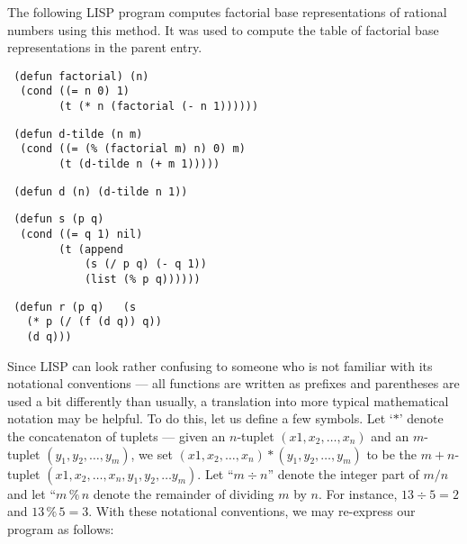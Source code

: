 \documentclass[12pt]{article}
\begin{document}
The following LISP program computes factorial base
representations of rational numbers using this method.
It was used to compute the table of factorial base
representations in the parent entry.

\begin{flushleft}
\texttt{
(defun factorial) (n) \\
\ \ (cond ((= n 0) 1) \\
\ \ \ \ \ \ \ \ (t (* n (factorial (- n 1))))))}
\end{flushleft}

\begin{flushleft}
\texttt{
(defun d-tilde (n m) \\
\ \ (cond ((= (\% (factorial m) n) 0) m) \\
\ \ \ \ \ \ \ \ (t (d-tilde n (+ m 1))))) }
\end{flushleft}

\begin{flushleft}
\texttt{
(defun d (n) (d-tilde n 1))}
\end{flushleft}

\begin{flushleft}
\texttt{
(defun s (p q) \\
\ \ (cond ((= q 1) nil) \\
\ \ \ \ \ \ \ \ (t (append \\
\ \ \ \ \ \ \ \ \ \ \ \ (s (/ p q) (- q 1)) \\
\ \ \ \ \ \ \ \ \ \ \ \ (list (\% p q)))))) }
\end{flushleft}

\begin{flushleft}
\texttt{
(defun r (p q)
\ \ (s \\
\ \ \ (* p (/ (f (d q)) q)) \\
\ \ \ (d q))) }
\end{flushleft}

Since LISP can look rather confusing to someone who is not familiar
with its notational conventions --- all functions are written as
prefixes and parentheses are used a bit differently than usually, 
a translation into more typical mathematical notation may be helpful.  
To do this, let us define a few symbols.  Let `$\ast$' denote the 
concatenaton of tuplets --- given an $n$-tuplet $(x1, x_2, \ldots, x_n)$
and an $m$-tuplet $(y_1, y_2, \ldots, y_m)$, we set
$(x1, x_2, \ldots, x_n) \ast (y_1, y_2, \ldots, y_m)$ to be the
$m+n$-tuplet $(x1, x_2, \ldots, x_n, y_1, y_2, \ldots y_m)$.
Let ``$m \div n$'' denote the integer part of $m/n$ and let
``$m \operatorname{\%} n$ denote the remainder of dividing $m$ by $n$.  For
instance, $13 \div 5 = 2$ and $13 \operatorname{\%} 5 = 3$.  With these notational
conventions, we may re-express our program as follows:
\end{document}
